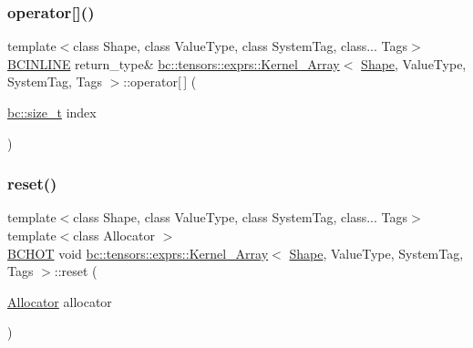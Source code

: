\mbox{\label{structbc_1_1tensors_1_1exprs_1_1Kernel__Array_a4189673aa2016bbf745afdb38eaaa4bd}} 
\subsubsection{\texorpdfstring{operator[]()}{operator[]()}\hspace{0.1cm}{\footnotesize\ttfamily [2/2]}}
{\footnotesize\ttfamily template$<$class Shape, class Value\+Type, class System\+Tag, class... Tags$>$ \\
\hyperlink{common_8h_a6699e8b0449da5c0fafb878e59c1d4b1}{B\+C\+I\+N\+L\+I\+NE} return\+\_\+type\& \hyperlink{structbc_1_1tensors_1_1exprs_1_1Kernel__Array}{bc\+::tensors\+::exprs\+::\+Kernel\+\_\+\+Array}$<$ \hyperlink{structbc_1_1Shape}{Shape}, Value\+Type, System\+Tag, Tags $>$\+::operator\mbox{[}$\,$\mbox{]} (\begin{DoxyParamCaption}\item[{\hyperlink{namespacebc_aaf8e3fbf99b04b1b57c4f80c6f55d3c5}{bc\+::size\+\_\+t}}]{index }\end{DoxyParamCaption})\hspace{0.3cm}{\ttfamily [inline]}}

\mbox{\label{structbc_1_1tensors_1_1exprs_1_1Kernel__Array_ae551c5aebb87e199c1473a1c9cfa6605}} 
\subsubsection{\texorpdfstring{reset()}{reset()}}
{\footnotesize\ttfamily template$<$class Shape, class Value\+Type, class System\+Tag, class... Tags$>$ \\
template$<$class Allocator $>$ \\
\hyperlink{common_8h_ac085f07cc309e3aac24aa3fc0a40f6d2}{B\+C\+H\+OT} void \hyperlink{structbc_1_1tensors_1_1exprs_1_1Kernel__Array}{bc\+::tensors\+::exprs\+::\+Kernel\+\_\+\+Array}$<$ \hyperlink{structbc_1_1Shape}{Shape}, Value\+Type, System\+Tag, Tags $>$\+::reset (\begin{DoxyParamCaption}\item[{\hyperlink{classbc_1_1allocators_1_1Allocator}{Allocator}}]{allocator }\end{DoxyParamCaption})\hspace{0.3cm}{\ttfamily [inline]}}



